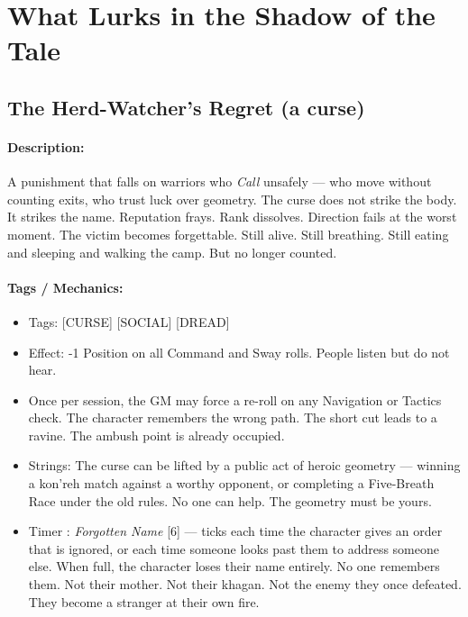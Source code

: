 \section*{What Lurks in the Shadow of the Tale}

\subsection*{The Herd-Watcher's Regret (a curse)}

\paragraph{Description:}

A punishment that falls on warriors who \textit{Call} unsafely --- who move without counting exits, who trust luck over geometry. The curse does not strike the body. It strikes the name. Reputation frays. Rank dissolves. Direction fails at the worst moment. The victim becomes forgettable. Still alive. Still breathing. Still eating and sleeping and walking the camp. But no longer counted.

\paragraph{Tags / Mechanics:}

\begin{itemize}
\item Tags: [CURSE] [SOCIAL] [DREAD]
\item Effect: -1 Position on all Command and Sway rolls. People listen but do not hear.
\item Once per session, the GM may force a re-roll on any Navigation or Tactics check. The character remembers the wrong path. The short cut leads to a ravine. The ambush point is already occupied.
\item Strings: The curse can be lifted by a public act of heroic geometry --- winning a kon'reh match against a worthy opponent, or completing a Five-Breath Race under the old rules. No one can help. The geometry must be yours.
\item Timer : \textit{Forgotten Name} [6] --- ticks each time the character gives an order that is ignored, or each time someone looks past them to address someone else. When full, the character loses their name entirely. No one remembers them. Not their mother. Not their khagan. Not the enemy they once defeated. They become a stranger at their own fire.
\end{itemize}

